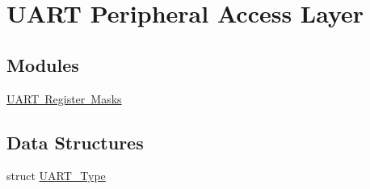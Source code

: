\hypertarget{group___u_a_r_t___peripheral___access___layer}{}\section{U\+A\+RT Peripheral Access Layer}
\label{group___u_a_r_t___peripheral___access___layer}
\subsection*{Modules}
\begin{DoxyCompactItemize}
\item 
\mbox{\hyperlink{group___u_a_r_t___register___masks}{U\+A\+R\+T Register Masks}}
\end{DoxyCompactItemize}
\subsection*{Data Structures}
\begin{DoxyCompactItemize}
\item 
struct \mbox{\hyperlink{struct_u_a_r_t___type}{U\+A\+R\+T\+\_\+\+Type}}
\end{DoxyCompactItemize}

